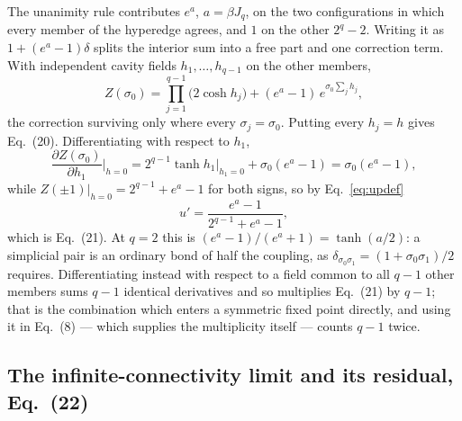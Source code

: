 \documentclass[aps,pre,onecolumn,superscriptaddress,floatfix,nofootinbib]{revtex4-2}
\begin{document}
The unanimity rule contributes $e^{a}$, $a=\beta J_q$, on the two configurations
in which every member of the hyperedge agrees, and $1$ on the other $2^q-2$.
Writing it as $1+(e^{a}-1)\delta$ splits the interior sum into a free part and
one correction term. With independent cavity fields $h_1,\dots,h_{q-1}$ on the
other members,
\begin{equation}
  Z(\sigma_0)=\prod_{j=1}^{q-1}\big(2\cosh h_j\big)
              +(e^{a}-1)\,e^{\sigma_0\sum_j h_j},
  \label{eq:simZgen}
\end{equation}
the correction surviving only where every $\sigma_j=\sigma_0$. Putting every
$h_j=h$ gives Eq.~(20). Differentiating with respect to $h_1$,
\begin{equation}
  \frac{\partial Z(\sigma_0)}{\partial h_1}\bigg|_{h=0}
  =2^{q-1}\tanh h_1\big|_{h_1=0}+\sigma_0(e^{a}-1)=\sigma_0(e^{a}-1),
\end{equation}
while $Z(\pm1)|_{h=0}=2^{q-1}+e^{a}-1$ for both signs, so by
Eq.~\eqref{eq:updef}
\begin{equation}
  u'=\frac{e^{a}-1}{2^{q-1}+e^{a}-1},
\end{equation}
which is Eq.~(21). At $q=2$ this is $(e^{a}-1)/(e^{a}+1)=\tanh(a/2)$: a
simplicial pair is an ordinary bond of half the coupling, as
$\delta_{\sigma_0\sigma_1}=(1+\sigma_0\sigma_1)/2$ requires. Differentiating
instead with respect to a field common to all $q-1$ other members sums $q-1$
identical derivatives and so multiplies Eq.~(21) by $q-1$; that is the
combination which enters a symmetric fixed point directly, and using it in
Eq.~(8) --- which supplies the multiplicity itself --- counts $q-1$ twice.

\subsection{The infinite-connectivity limit and its residual, Eq.~(22)}
\end{document}
